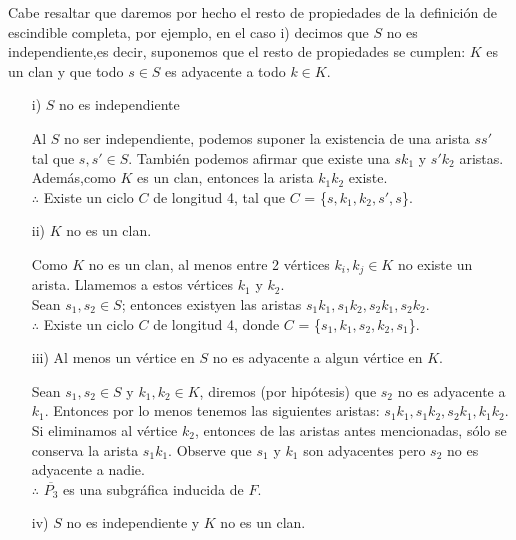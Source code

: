 \documentclass[12pt]{article}
\begin{document}
Cabe resaltar que daremos por hecho el resto de propiedades de la definición de escindible completa, por ejemplo, en el caso i) decimos que $S$ no es independiente,es decir, suponemos que el resto de propiedades se cumplen: $K$ es un clan y que todo $s \in S$ es adyacente a todo $k \in K$.\\
\begin{enumerate}
	\item[i)]$S$ no es independiente
	
	Al $S$ no ser independiente, podemos suponer la existencia de una arista $ss'$ tal que $s,s' \in S$. También podemos afirmar que existe una $sk_1$ y $s'k_2$ aristas. Además,como $K$ es un clan, entonces la arista $k_1k_2$ existe.\\
	
	$\therefore$ Existe un ciclo $C$ de longitud 4, tal que $C$ = \{$s,k_1,k_2,s',s$\}.\\
	
	\item[ii)]$K$ no es un clan.
	
	Como $K$ no es un clan, al menos entre 2 vértices $k_i,k_j \in K$ no existe un arista. Llamemos a estos vértices $k_1$ y $k_2$.\\
	
	Sean $s_1,s_2 \in S$; entonces existyen las aristas $s_1k_1,s_1k_2,s_2k_1,s_2k_2$.\\
	
	$\therefore$ Existe un ciclo $C$ de longitud 4, donde $C$ = \{$s_1,k_1,s_2,k_2,s_1$\}.\\
	
	\item[iii)]Al menos un vértice en $S$ no es adyacente a algun vértice en $K$.
	
	Sean $s_1,s_2 \in S$ y $k_1,k_2 \in K$, diremos (por hipótesis) que $s_2$ no es adyacente a $k_1$. Entonces por lo menos tenemos las siguientes aristas: $s_1k_1,s_1k_2,s_2k_1,k_1k_2$.\\
	
	Si eliminamos al vértice $k_2$, entonces de las aristas antes mencionadas, sólo se conserva la arista $s_1k_1$. Observe que $s_1$ y $k_1$ son adyacentes pero $s_2$ no es adyacente a nadie.\\
	
	$\therefore$ $\overline{P_3}$ es una subgráfica inducida de $F$.\\
	
	\item[iv)]$S$ no es independiente y $K$ no es un clan.
	

\end{enumerate}
\end{document}
